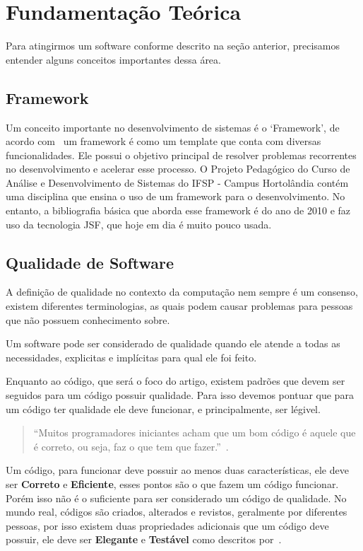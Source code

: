 \documentclass[12pt]{article}
\begin{document}
\section{Fundamentação Teórica}

Para atingirmos um software conforme descrito na seção anterior, precisamos entender
alguns conceitos importantes dessa área.

\subsection{Framework}

Um conceito importante no desenvolvimento de sistemas é o `Framework', de acordo com~\cite{host12} um
framework é como um template que conta com diversas funcionalidades. Ele possui o objetivo principal de
resolver problemas recorrentes no desenvolvimento e acelerar esse processo. O
Projeto Pedagógico do Curso de Análise e Desenvolvimento de Sistemas do IFSP - Campus Hortolândia
contém uma disciplina que ensina o uso de um framework para o desenvolvimento. No entanto, a bibliografia básica
que aborda esse framework é do ano de 2010 e faz uso da tecnologia JSF, que hoje em dia é muito pouco usada.~\cite{webtechsurveyJSF}

\subsection{Qualidade de Software}

A definição de qualidade no contexto da computação nem sempre é um consenso,
existem diferentes terminologias, as quais podem causar problemas para pessoas que não
possuem conhecimento sobre.~\cite{Duarte03}

Um software pode ser considerado de qualidade quando ele atende a todas as necessidades, explicitas
e implícitas para qual ele foi feito.~\cite{Duarte03}

Enquanto ao código, que será o foco do artigo, existem padrões que devem ser seguidos para um código
possuir qualidade. Para isso devemos pontuar que para um código ter qualidade ele deve funcionar, e principalmente,
ser légivel.

\begin{quote}
  ``Muitos programadores iniciantes acham que um bom código é aquele que é correto, ou seja, faz o que tem
  que fazer.''~\cite{Levy04}.
\end{quote}

Um código, para funcionar deve possuir ao menos duas características, ele deve ser \textbf{Correto} e \textbf{Eficiente},
esses pontos são o que fazem um código funcionar. Porém isso não é o suficiente para ser considerado
um código de qualidade. No mundo real, códigos são criados, alterados e revistos, geralmente por diferentes pessoas,
por isso existem duas propriedades adicionais que um código deve possuir, ele deve ser \textbf{Elegante} e \textbf{Testável}
como descritos por~\cite{Levy04}.
\end{document}
